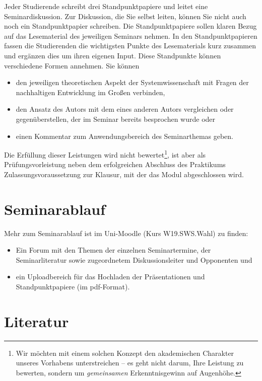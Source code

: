 \documentclass[11pt,a4paper]{article}
\begin{document}
Jeder Studierende schreibt drei Standpunktpapiere und leitet eine
Seminardiskussion.  Zur Diskussion, die Sie selbst leiten, können Sie nicht
auch noch ein Standpunktpapier schreiben. Die Standpunktpapiere sollen klaren
Bezug auf das Lesematerial des jeweiligen Seminars nehmen. In den
Standpunktpapieren fassen die Studierenden die wichtigsten Punkte des
Lesematerials kurz zusammen und ergänzen dies um ihren eigenen Input. Diese
Standpunkte können verschiedene Formen annehmen. Sie können
\begin{itemize}
\item den jeweiligen theoretischen Aspekt der Systemwissenschaft mit Fragen
  der nachhaltigen Entwicklung im Großen verbinden,
\item den Ansatz des Autors mit dem eines anderen Autors vergleichen oder
  gegenüberstellen, der im Seminar bereits besprochen wurde oder
\item einen Kommentar zum Anwendungsbereich des Seminarthemas geben.
\end{itemize}
Die Erfüllung dieser Leistungen wird nicht bewertet\footnote{Wir möchten mit
  einem solchen Konzept den akademischen Charakter unseres Vorhabens
  unterstreichen -- es geht nicht darum, Ihre Leistung zu bewerten, sondern um
  \emph{gemeinsamen} Erkenntnisgewinn auf Augenhöhe.}, ist aber als
Prüfungsvorleistung neben dem erfolgreichen Abschluss des Praktikums
Zulassungsvoraussetzung zur Klausur, mit der das Modul abgeschlossen wird.

\section{Seminarablauf}

Mehr zum Seminarablauf ist im Uni-Moodle (Kurs W19.SWS.Wahl) zu finden: 
\begin{itemize}
\item Ein Forum mit den Themen der einzelnen Seminartermine, der
  Seminarliteratur sowie zugeordnetem Diskussionsleiter und Opponenten und
\item ein Uploadbereich für das Hochladen der Präsentationen und
  Standpunktpapiere (im pdf-Format).
\end{itemize}

\section{Literatur}
\end{document}
